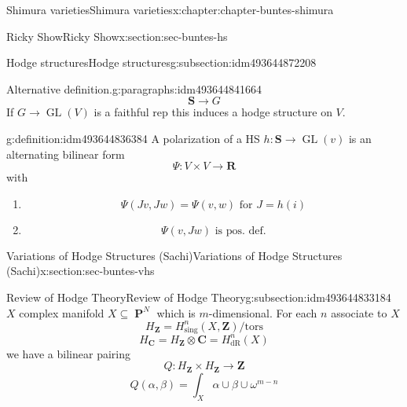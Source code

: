 \documentclass[oneside,10pt,]{book}
\numberwithin{equation}{section}
\newcommand{\ZZ}{\mathbf{Z}}
\newcommand{\RR}{\mathbf{R}}
\newcommand{\CC}{\mathbf{C}}
\newcommand{\dR}{\mathrm{dR}}
\newcommand{\tors}{\mathrm{tors}}
\DeclareMathOperator{\PP}{\mathbf{P}}
\DeclareMathOperator{\GL}{GL}
\begin{document}
\begin{chapterptx}{Shimura varieties}{}{Shimura varieties}{}{}{x:chapter:chapter-buntes-shimura}
\begin{sectionptx}{Ricky Show}{}{Ricky Show}{}{}{x:section:sec-buntes-hs}
\begin{subsectionptx}{Hodge structures}{}{Hodge structures}{}{}{g:subsection:idm493644872208}
\begin{paragraphs}{Alternative definition.}{g:paragraphs:idm493644841664}
\begin{equation*}
\mathbf S \to G
\end{equation*}
If \(G \to \GL(V)\) is a faithful rep this induces a hodge structure on \(V\).%
\begin{definition}{}{g:definition:idm493644836384}%
A polarization of a HS \(h\colon \mathbf S \to \GL(v)\) is an alternating bilinear form%
\begin{equation*}
\Psi \colon V\times V \to \RR
\end{equation*}
with%
\begin{enumerate}
\item{}%
\begin{equation*}
\Psi (Jv,Jw) =  \Psi(v,w) \text{ for } J = h(i)
\end{equation*}
%
\item{}%
\begin{equation*}
\Psi(v,Jw) \text{ is pos. def.}
\end{equation*}
%
\end{enumerate}
%
\end{definition}
\end{paragraphs}%
\end{subsectionptx}
\end{sectionptx}
%
%
\typeout{************************************************}
\typeout{************************************************}
%
\begin{sectionptx}{Variations of Hodge Structures (Sachi)}{}{Variations of Hodge Structures (Sachi)}{}{}{x:section:sec-buntes-vhs}
%
%
\typeout{************************************************}
\typeout{************************************************}
%
\begin{subsectionptx}{Review of Hodge Theory}{}{Review of Hodge Theory}{}{}{g:subsection:idm493644833184}
\(X\) complex manifold \(X\subseteq \PP^N\) which is \(m\)-dimensional. For each \(n\) associate to \(X\)%
\begin{equation*}
H_\ZZ = H^n_{\mathrm{sing}}(X, \ZZ) / \tors
\end{equation*}
%
\begin{equation*}
H_\CC = H_\ZZ \otimes \CC = H^n_\dR(X)
\end{equation*}
we have a bilinear pairing%
\begin{equation*}
Q\colon H_\ZZ \times H_\ZZ \to \ZZ
\end{equation*}
%
\begin{equation*}
Q(\alpha,\beta) = \int_X \alpha \cup \beta \cup \omega^{m-n}

\end{equation*}
\end{subsectionptx}
\end{sectionptx}
\end{chapterptx}
\end{document}
